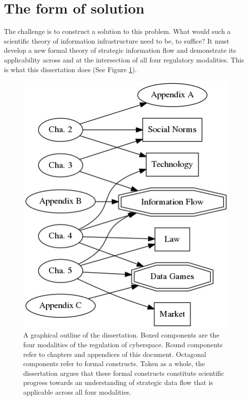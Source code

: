 \documentclass[../thesis.tex]{subfiles}
\begin{document}
 \section{The form of solution}

 The challenge is to construct a solution to this problem.
 What would such a scientific theory of information
 infrastructure need to be, to suffice?
 It must develop a new formal theory of strategic information
 flow and demonstrate its applicability across and
 at the intersection of all four regulatory modalities.
 This is what this dissertation does (See Figure \ref{fig:outline}).

 
 \begin{figure}
   \label{fig:outline}
  \centering
\includegraphics[scale=.75]{chapters/outline.png}
\caption[Graphical outline of this dissertation]{
  A graphical outline of the dissertation.
  Boxed components are the four modalities of
  the regulation of cyberspace.
  Round components refer to chapters and appendices
  of this document.
  Octagonal components refer to formal constructs.
  Taken as a whole, the dissertation argues that
  these formal constructs constitute scientific
  progress towards an understanding of strategic
  data flow that is applicable across all four
  modalities.
  }
\end{figure}
\end{document}
